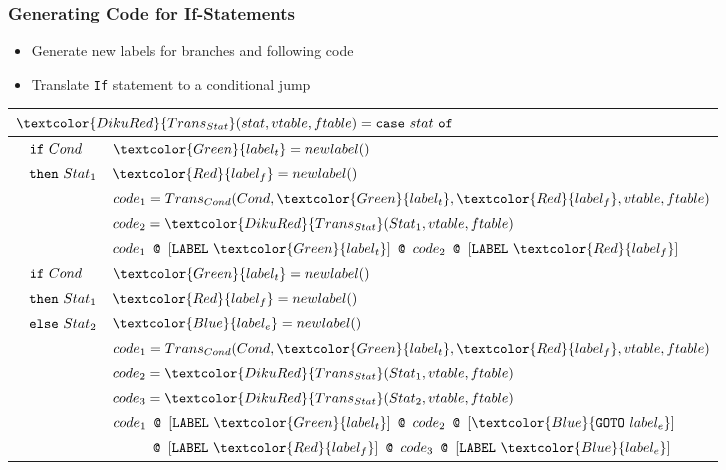 \documentclass{beamer}
\newcommand{\codesize}{\footnotesize}
\newcommand{\cd}[1]{{{\codesize\tt #1}}}
\newcommand{\red}[1]{\textcolor{Red}{{#1}}}
\newcommand{\blue}[1]{\textcolor{Blue}{{#1}}}
\newcommand{\green}[1]{\textcolor{Green}{{#1}}}
\renewcommand{\emph}[1]{\textcolor{structure}{#1}}
\newcommand{\emp}[1]{\textcolor{DikuRed}{ #1}}
\begin{document}
\begin{frame}[fragile,t]
	\frametitle{Generating Code for If-Statements}

\begin{itemize}
\item Generate \emph{new labels} for branches and following code

\item Translate \cd{If} statement to a \emph{conditional jump}

\end{itemize}
\pause

\bigskip

{\footnotesize
\renewcommand{\arraystretch}{0.9}
\begin{tabular}{lll}%
\multicolumn{3}{l}{$\emp{Trans_{Stat}}(stat,vtable,ftable)
 = \mbox{\tt case}~stat~\mbox{\tt of}$} \\\hline

&${\tt if}~Cond$
        & $\green{label_t} = newlabel()$ \\
&${\tt then}~Stat_1$
        & $\red{label_f} = newlabel()$ \\
&        & $code_1 = Trans_{Cond}(Cond,\green{label_t},\red{label_f},vtable,ftable)$ \\
&        & $code_2 = \emp{Trans_{Stat}}(Stat_1,vtable,ftable)$ \\
&        & $code_1 \concat [{\tt LABEL}~\green{label_t}] 
	\concat code_2 \concat [{\tt LABEL}~\red{label_f}]$ \\\hline
&${\tt if}~Cond$
        & $\green{label_t} = newlabel()$ \\
&${\tt then}~Stat_1$
        & $\red{label_f} = newlabel()$ \\
&${\tt else}~Stat_2$
        & $\blue{label_e} = newlabel()$ \\
&        & $code_1 = Trans_{Cond}(Cond,\green{label_t},\red{label_f},vtable,ftable)$ \\
&        & $code_2 = \emp{Trans_{Stat}}(Stat_1,vtable,ftable)$ \\
&        & $code_3 = \emp{Trans_{Stat}}(Stat_2,vtable,ftable)$ \\
&        & $code_1 \concat [{\tt LABEL}~\green{label_t}] \concat code_2 \concat [\blue{{\tt GOTO}~label_e}] $\\
&        & $~~~~~~~\concat [{\tt LABEL}~\red{label_f}] \concat code_3 \concat [{\tt LABEL}~\blue{label_e}]$ \\\hline

\end{tabular}
}
%
%
%
%
%
\end{frame}
\end{document}
